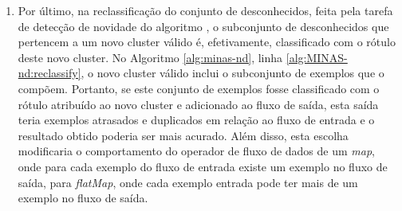 \begin{enumerate}
  \item \label{reclassification} Por último, na reclassificação do conjunto de desconhecidos,
  feita pela tarefa de detecção de novidade do algoritmo \minas, o subconjunto de
  desconhecidos que pertencem a um novo cluster válido é, efetivamente,
  classificado com o rótulo deste novo cluster.
  No Algoritmo \ref{alg:minas-nd}, linha \ref{alg:MINAS-nd:reclassify},
  o novo cluster válido inclui o subconjunto de exemplos que o compõem.
  Portanto, se este conjunto de exemplos fosse classificado com o rótulo atribuído ao
  novo cluster e adicionado ao fluxo de saída, esta saída teria exemplos
  atrasados e duplicados em relação ao fluxo de entrada e o resultado obtido
  poderia ser mais acurado.
  Além disso, esta escolha modificaria o comportamento do operador de fluxo de
  dados de um \emph{map}, onde para cada exemplo do fluxo de entrada existe um
  exemplo no fluxo de saída, para \emph{flatMap}, onde cada exemplo entrada pode
  ter mais de um exemplo no fluxo de saída.

\end{enumerate}







